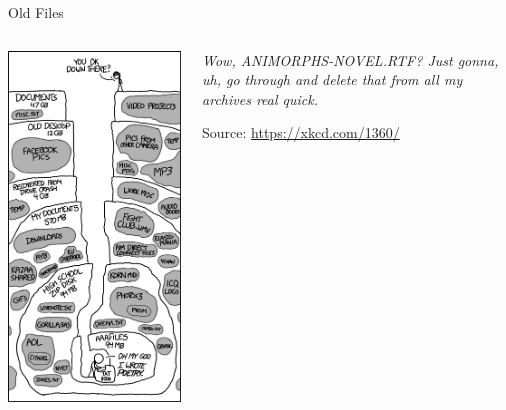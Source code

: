 \begin{frame}{Old Files}
%
\begin{columns}[T]
\includegraphics[width=\linewidth]{./gfx/xkcd-oldfiles}
%
\begin{center}
\emph{Wow, ANIMORPHS-NOVEL.RTF? Just gonna, uh, go through and delete that from all my archives real quick.}

\vspace{12pt}
Source: \url{https://xkcd.com/1360/}
\end{center}
\end{columns}
%
\end{frame}

